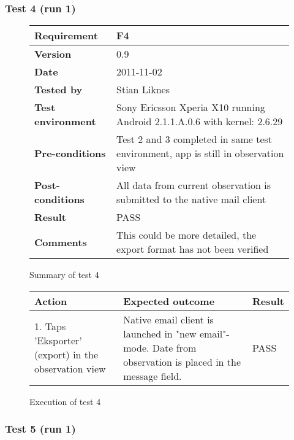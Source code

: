 \newpage
\subsubsection{Test 4 (run 1)}

	\begin{figure}[htb]
		\centering
		\begin{tabular}{|p{3.5cm}|p{7.0cm}|} \hline
			\textbf{Requirement} & F4 \\ \hline
			\textbf{Version} & 0.9 \\ \hline
			\textbf{Date} & 2011-11-02 \\ \hline
			\textbf{Tested by} & Stian Liknes \\ \hline
			\textbf{Test environment} & Sony Ericsson Xperia X10 running Android 2.1.1.A.0.6 with kernel: 2.6.29 \\ \hline
			\textbf{Pre-conditions} & Test 2 and 3 completed in same test environment, app is still in observation view \\ \hline
			\textbf{Post-conditions} & All data from current observation is submitted to the native mail client \\ \hline
			\textbf{Result} & PASS \\ \hline
			\textbf{Comments} & This could be more detailed, the export format has not been verified  \\ \hline
		\end{tabular}
		\caption{Summary of test 4}
	\end{figure}

	\begin{figure}[htb]
		\centering
		\begin{tabular}{|p{5.0cm}|p{5.0cm}|p{1cm}|}
			\hline \textbf{Action} & \textbf{Expected outcome} & \textbf{Result} \\ \hline
			1. Taps 'Eksporter' (export) in the observation view &
			Native email client is launched in "new email"-mode. Date from
			observation is placed in the message field. &
			PASS \\ \hline
		\end{tabular}
		\caption{Execution of test 4}
	\end{figure}

\newpage
\subsubsection{Test 5 (run 1)}

